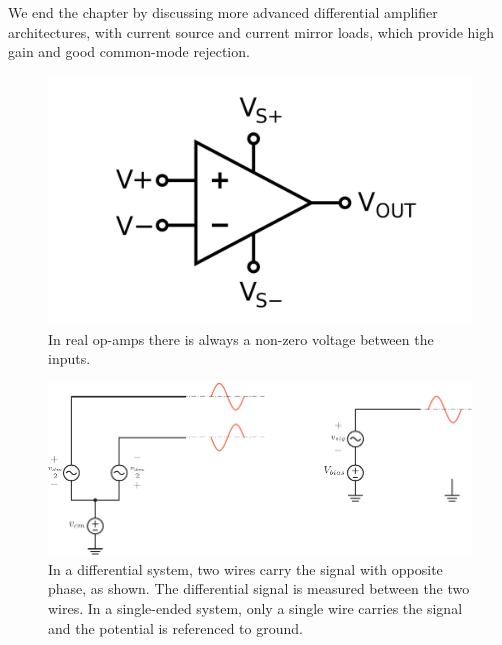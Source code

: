 We end the chapter by discussing more advanced differential amplifier architectures, with current source and current mirror loads, which provide high gain and good common-mode rejection.
\begin{figure}[H]
\centering
\includegraphics[scale=0.35]{op_amp_diff}
\caption{In real op-amps there is always a non-zero voltage between the inputs.}
\label{fig:ch16_intro}
\end{figure}
\newpage
\begin{figure}[tb]
\centering
\includegraphics[scale=1.00]{diff_vs_cm} 
\caption{In a differential system, two wires carry the signal with opposite phase, as shown.  The differential signal is measured between the two wires.  In a single-ended system, only a single wire carries the signal and the potential is referenced to ground.}
\label{fig:diff_circ}
\end{figure}
